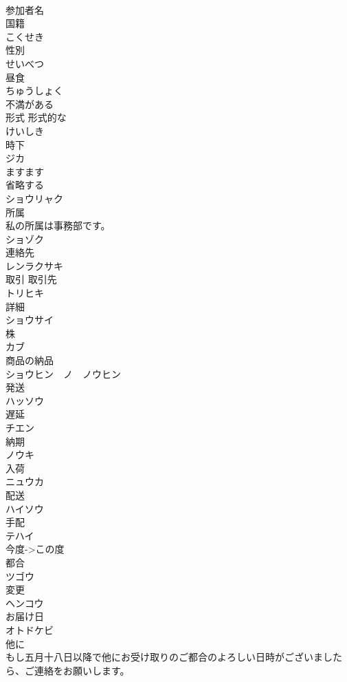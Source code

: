 \documentclass[8pt]{extreport}
\begin{document}
\begin{CJK}{UTF8}{min}
\\	参加者名	
\\	国籍	
\\	こくせき
\\	性別	
\\	せいべつ
\\	昼食	
\\	ちゅうしょく
\\	不満がある	
\\	形式 形式的な	
\\	けいしき
\\	時下	
\\	ジカ
\\	ますます	
\\	省略する	
\\	ショウリャク
\\	所属	
\\	私の所属は事務部です。 
\\	ショゾク
\\	連絡先	
\\	レンラクサキ
\\	取引 取引先	
\\	トリヒキ 
\\	詳細	
\\	ショウサイ
\\	株	
\\	カブ
\\	商品の納品	
\\	ショウヒン　ノ　ノウヒン
\\	発送	
\\	ハッソウ
\\	遅延	
\\	チエン
\\	納期	
\\	ノウキ
\\	入荷	
\\	ニュウカ
\\	配送	
\\	ハイソウ
\\	手配	
\\	テハイ
\\	今度->この度	
\\	都合	
\\	ツゴウ
\\	変更	
\\	ヘンコウ
\\	お届け日	
\\	オトドケビ
\\	他に 
\\	もし五月十八日以降で他にお受け取りのご都合のよろしい日時がございましたら、ご連絡をお願いします。	

\end{CJK}
\end{document}
